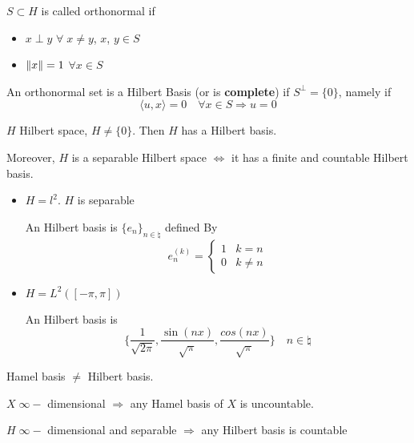 \begin{definition}
    \(S \subset H\) is called orthonormal if 
    \begin{itemize}
        \item \(x \perp y\) \(\forall\; x \neq y\), \(x\), \(y \in S\)
        \item \(\norm{x} = 1\) \(\forall x \in S\)
    \end{itemize}
\end{definition}
\begin{definition}
    An orthonormal set is a Hilbert Basis (or is \textbf{complete}) if \(S^\perp = \{0\}\), namely if 
    \[
        \langle u, x\rangle   = 0 \quad \forall x \in S \Rightarrow u=0
    \]
\end{definition}
\begin{theorem}
    \(H\) Hilbert space, \(H \neq \{0\}\). Then \(H\) has a Hilbert basis.

\noindent Moreover, \(H\) is a separable Hilbert space \(\Leftrightarrow \) it has a finite and countable Hilbert basis.
\end{theorem}
\begin{example}
    \begin{itemize}
        \item \(H = l^2\). \(H\) is separable
        
        An Hilbert basis is \(\{e_n\}_{n \in \natural}\) defined By
        \[
            e_n^{(k)} = 
            \begin{cases}
                1 & k=n \\
                0 & k \neq n
            \end{cases}
        \]
    
        \item \(H = L^2([-\pi, \pi])\)
        
        An Hilbert basis is
        \[
            \lbrace \frac{1}{\sqrt{2\pi}}, \frac{\sin(nx)}{\sqrt{\pi}}, \frac{cos(nx)}{\sqrt{\pi}} \rbrace \quad n \in \natural
        \]
    \end{itemize}
\end{example}
\begin{remark}
    Hamel basis \(\neq\) Hilbert basis.

    \(X \; \infty-\) dimensional \(\Rightarrow\) any Hamel basis of \(X\) is uncountable.

    \(H \; \infty-\) dimensional and separable \(\Rightarrow\) any Hilbert basis is countable
\end{remark}

